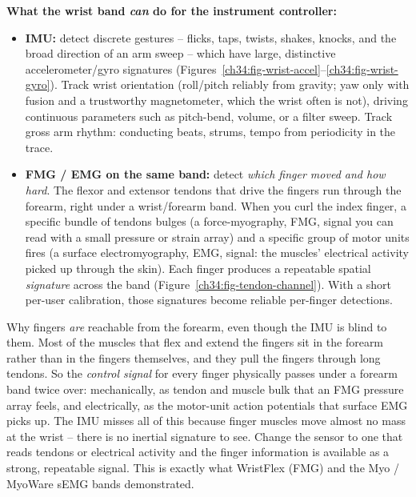 \begin{goalbox}
\textbf{What the wrist band \emph{can} do for the instrument controller:}
\begin{itemize}
\item \textbf{IMU:} detect discrete gestures -- flicks, taps, twists, shakes, knocks,
  and the broad direction of an arm sweep -- which have large, distinctive
  accelerometer/gyro signatures
  (Figures~\ref{ch34:fig-wrist-accel}--\ref{ch34:fig-wrist-gyro}). Track wrist
  orientation (roll/pitch reliably from gravity; yaw only with fusion and a trustworthy
  magnetometer, which the wrist often is not), driving continuous parameters such as
  pitch-bend, volume, or a filter sweep. Track gross arm rhythm: conducting beats,
  strums, tempo from periodicity in the trace.
\item \textbf{FMG / EMG on the same band:} detect \emph{which finger moved and how
  hard}. The flexor and extensor tendons that drive the fingers run through the forearm,
  right under a wrist/forearm band. When you curl the index finger, a specific bundle of
  tendons bulges (a force-myography, FMG, signal you can read with a small pressure or
  strain array) and a specific group of motor units fires (a surface electromyography, EMG, signal: the muscles' electrical activity
  picked up through the skin). Each
  finger produces a repeatable spatial \emph{signature} across the band
  (Figure~\ref{ch34:fig-tendon-channel}). With a short per-user calibration, those
  signatures become reliable per-finger detections.
\end{itemize}
\end{goalbox}

\begin{whybox}
Why fingers \emph{are} reachable from the forearm, even though the IMU is blind to them.
Most of the muscles that flex and extend the fingers sit in the forearm rather than in the fingers themselves,
and they pull the fingers through long tendons. So the \emph{control signal} for every
finger physically passes under a forearm band twice over: mechanically, as tendon and
muscle bulk that an FMG pressure array feels, and electrically, as the motor-unit action
potentials that surface EMG picks up. The IMU misses all of this because finger muscles
move almost no mass at the wrist -- there is no inertial signature to see. Change the
sensor to one that reads tendons or electrical activity and the finger information is
available as a strong, repeatable signal. This is exactly what WristFlex (FMG) and the Myo /
MyoWare sEMG bands demonstrated.
\end{whybox}


